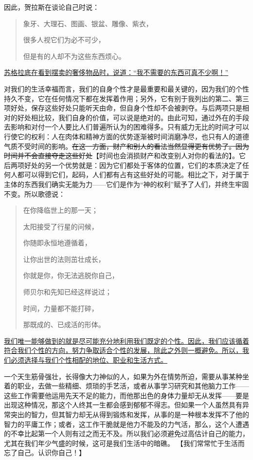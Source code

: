 \documentclass[12pt,oneside]{book}
\begin{document}
因此，贺拉斯在谈论自己时说： 


\begin{quotation}
象牙、大理石、图画、银盆、雕像、紫衣， 

很多人视它们为必不可少， 

但是有的人却不为这些东西烦心。 
\end{quotation}


\uline{苏格拉底在看到摆卖的奢侈物品时，说道：“我不需要的东西可真不少啊！”}

对我们的生活幸福而言，我们的自身个性才是最重要和最关键的，因为我们的个性持久不变，它在任何情况下都在发挥着作用；另外，它有别于我列出的第二、第三项好处，保存这些好处只能听天由命，但自身个性却不会被剥夺。与后两项只是相对的好处相比较，我们自身的价值，可以说是绝对的。由此可知，通过外在的手段去影响和对付一个人要比人们普遍所认为的困难得多。只有威力无比的时间才可以行使它的权利：人在肉体和精神方面的优势逐渐被时间消磨净尽，也只有人的道德气质不受时间的影响。\sout{在这一方面，财产和别人的看法当然显得更有优势了。因为时间并不会直接夺走这些好处}【时间也会消损财产和改变别人对你的看法的】。它后两项好处的另一个优势就是：因为它们都处于客体的位置，它们的本质决定了任何人都可以得到它们，起码，人们都有占有这些好处的可能。相比之下，对于属于主体的东西我们确实无能为力——它们是作为“神的权利”赋予了人们，并终生牢固不变。所以歌德说： 

 
\begin{quotation}
在你降临世上的那一天； 

太阳接受了行星的问候， 

你随即永恒地遵循着， 

让你出世的法则茁壮成长， 

你就是你，你无法逃脱你自己， 

师贝尔和先知已经这样说过； 

 时间，力量都不能打碎， 

那既成的、已成活的形体。 
\end{quotation}


\uline{我们唯一能够做到的就是尽可能充分地利用我们既定的个性。因此，我们应该循着符合我们个性的方向，努力争取适合个性的发展，除此之外则一概避免。所以，我们必须选择与我们个性相配的地位、职业和生活方式。}

一个天生筋骨强壮，长得像大力神似的人，如果为外在情势所迫，需要从事某种坐着的职业，去做一些精细、烦琐的手艺活，或者从事学习研究和其他脑力工作——这些工作需要他运用先天不足的能力，而他那出色的身体力量却无从发挥——要是出现这种情况，那这个人终其一生都会感到郁郁不得志。但如果一个人虽然具有异常突出的智力，但其智力却无从得到锻炼和发挥，从事的是一种根本发挥不了他的智力的平庸工作；或者，这工作干脆就是他力不能及的力气活，那么，这个人遭遇的不幸比起第一个人则有过之而无不及。所以我们必须避免过高估计自己的能力，尤其在我们年少气盛的时候，这可是我们生活中的暗礁。 【我们常常忙于生活而忘了自己。认识你自己！】
\end{document}
